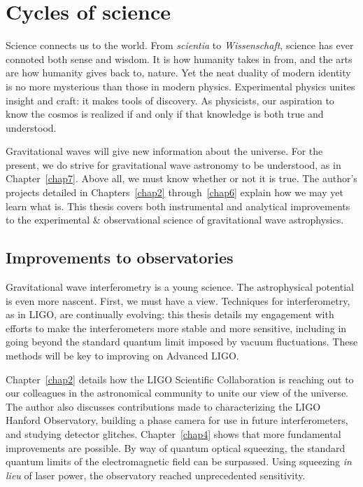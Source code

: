 


 
    \section{Cycles of science}
    \label{cycles}


Science connects us to the world. 
From \textit{scientia} to \textit{Wissenschaft}, science has ever connoted both sense and wisdom.
It is how humanity takes in from, and the arts are how humanity gives back to, nature.
Yet the neat duality of modern identity is no more mysterious than those in modern physics.
Experimental physics unites insight and craft: it makes tools of discovery.
As physicists, our aspiration to know the cosmos is realized if and only if that knowledge is both true and understood.

Gravitational waves will give new information about the universe.
For the present, we do strive for gravitational wave astronomy to be understood, as in Chapter~\ref{chap7}.
Above all, we must know whether or not it is true.
The author's projects detailed in Chapters~\ref{chap2} through~\ref{chap6} explain how we may yet learn what is.
This thesis covers both instrumental and analytical improvements to the experimental \& observational science of gravitational wave astrophysics.

        \subsection{Improvements to observatories}
        \label{observatories_better}

Gravitational wave interferometry is a young science.
The astrophysical potential is even more nascent.
First, we must have a view. 
Techniques for interferometry, as in LIGO, are continually evolving: this thesis details my engagement with efforts to make the interferometers more stable and more sensitive, including in going beyond the standard quantum limit imposed by vacuum fluctuations.
These methods will be key to improving on Advanced LIGO.

Chapter~\ref{chap2} details how the LIGO Scientific Collaboration is reaching out to our colleagues in the astronomical community to unite our view of the universe.
The author also discusses contributions made to characterizing the LIGO Hanford Observatory, building a phase camera for use in future interferometers, and studying detector glitches.
Chapter~\ref{chap4} shows that more fundamental improvements are possible.
By way of quantum optical squeezing, the standard quantum limits of the electromagnetic field can be surpassed.
Using squeezing \textit{in lieu} of laser power, the observatory reached unprecedented sensitivity.

